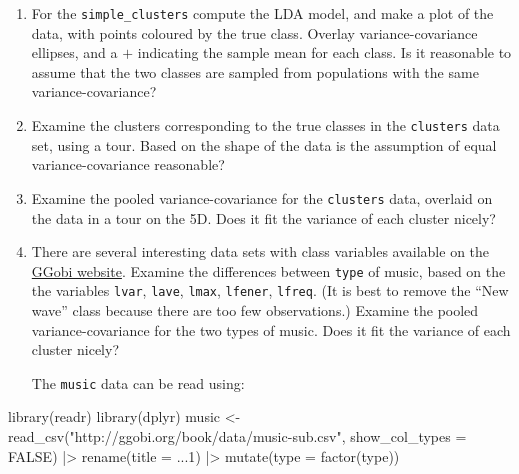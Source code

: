 \documentclass[
  letterpaper,
]{krantz}
\newenvironment{Shaded}{\begin{snugshade}}{\end{snugshade}}
\newcommand{\AttributeTok}[1]{\textcolor[rgb]{0.40,0.45,0.13}{#1}}
\newcommand{\ConstantTok}[1]{\textcolor[rgb]{0.56,0.35,0.01}{#1}}
\newcommand{\FunctionTok}[1]{\textcolor[rgb]{0.28,0.35,0.67}{#1}}
\newcommand{\NormalTok}[1]{\textcolor[rgb]{0.00,0.23,0.31}{#1}}
\newcommand{\OtherTok}[1]{\textcolor[rgb]{0.00,0.23,0.31}{#1}}
\newcommand{\SpecialCharTok}[1]{\textcolor[rgb]{0.37,0.37,0.37}{#1}}
\newcommand{\StringTok}[1]{\textcolor[rgb]{0.13,0.47,0.30}{#1}}
\begin{document}

 
  
  

\begin{enumerate}
\def\labelenumi{\arabic{enumi}.}
\item
  For the \texttt{simple\_clusters} compute the LDA model, and make a
  plot of the data, with points coloured by the true class. Overlay
  variance-covariance ellipses, and a \(+\) indicating the sample mean
  for each class. Is it reasonable to assume that the two classes are
  sampled from populations with the same variance-covariance?
\item
  Examine the clusters corresponding to the true classes in the
  \texttt{clusters} data set, using a tour. Based on the shape of the
  data is the assumption of equal variance-covariance reasonable?
\item
  Examine the pooled variance-covariance for the \texttt{clusters} data,
  overlaid on the data in a tour on the 5D. Does it fit the variance of
  each cluster nicely?
\item
  There are several interesting data sets with class variables available
  on the \href{http://ggobi.org/book/index.html}{GGobi website}. Examine
  the differences between \texttt{type} of music, based on the the
  variables \texttt{lvar}, \texttt{lave}, \texttt{lmax},
  \texttt{lfener}, \texttt{lfreq}. (It is best to remove the ``New
  wave'' class because there are too few observations.) Examine the
  pooled variance-covariance for the two types of music. Does it fit the
  variance of each cluster nicely?

  The \texttt{music} data can be read using:
\end{enumerate}

\begin{Shaded}
\begin{Highlighting}[]
\FunctionTok{library}\NormalTok{(readr)}
\FunctionTok{library}\NormalTok{(dplyr)}
\NormalTok{music }\OtherTok{\textless{}{-}} \FunctionTok{read\_csv}\NormalTok{(}\StringTok{"http://ggobi.org/book/data/music{-}sub.csv"}\NormalTok{,}
                  \AttributeTok{show\_col\_types =} \ConstantTok{FALSE}\NormalTok{) }\SpecialCharTok{|\textgreater{}}
  \FunctionTok{rename}\NormalTok{(}\AttributeTok{title =} \StringTok{\textasciigrave{}}\AttributeTok{...1}\StringTok{\textasciigrave{}}\NormalTok{) }\SpecialCharTok{|\textgreater{}}
  \FunctionTok{mutate}\NormalTok{(}\AttributeTok{type =} \FunctionTok{factor}\NormalTok{(type))}
\end{Highlighting}
\end{Shaded}
\end{document}
